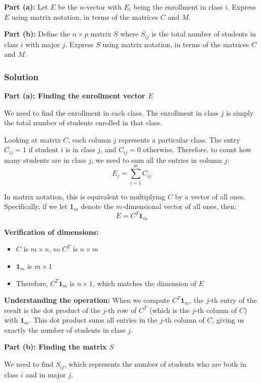 \documentclass[11pt]{article}
\begin{document}
\textbf{Part (a):} Let $E$ be the $n$-vector with $E_i$ being the enrollment in class $i$. Express $E$ using matrix notation, in terms of the matrices $C$ and $M$.

\textbf{Part (b):} Define the $n \times p$ matrix $S$ where $S_{ij}$ is the total number of students in class $i$ with major $j$. Express $S$ using matrix notation, in terms of the matrices $C$ and $M$.

\subsubsection{Solution}

\textbf{Part (a): Finding the enrollment vector $E$}

We need to find the enrollment in each class. The enrollment in class $j$ is simply the total number of students enrolled in that class.

Looking at matrix $C$, each column $j$ represents a particular class. The entry $C_{ij} = 1$ if student $i$ is in class $j$, and $C_{ij} = 0$ otherwise. Therefore, to count how many students are in class $j$, we need to sum all the entries in column $j$:
\[
E_j = \sum_{i=1}^{m} C_{ij}
\]

In matrix notation, this is equivalent to multiplying $C$ by a vector of all ones. Specifically, if we let $\mathbf{1}_m$ denote the $m$-dimensional vector of all ones, then:
\[
E = C^T \mathbf{1}_m
\]

\textbf{Verification of dimensions:}
\begin{itemize}
    \item $C$ is $m \times n$, so $C^T$ is $n \times m$
    \item $\mathbf{1}_m$ is $m \times 1$
    \item Therefore, $C^T \mathbf{1}_m$ is $n \times 1$, which matches the dimension of $E$
\end{itemize}

\textbf{Understanding the operation:} When we compute $C^T \mathbf{1}_m$, the $j$-th entry of the result is the dot product of the $j$-th row of $C^T$ (which is the $j$-th column of $C$) with $\mathbf{1}_m$. This dot product sums all entries in the $j$-th column of $C$, giving us exactly the number of students in class $j$.

\textbf{Part (b): Finding the matrix $S$}

We need to find $S_{ij}$, which represents the number of students who are both in class $i$ and in major $j$.
\end{document}
